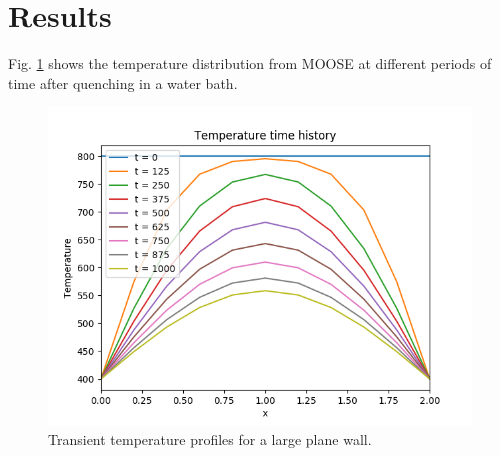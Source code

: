\documentclass[12pt]{article}
\begin{document}
\section*{Results}
Fig. \ref{time_history} shows the temperature distribution from MOOSE at different periods of time after quenching in a water bath.  
\begin{figure}[h]
   \centering
   \includegraphics[width=0.80      \textwidth]{T_time_history.png}
   \caption{Transient temperature profiles for a large plane wall.}
\label{time_history}
\end{figure}
\end{document}
